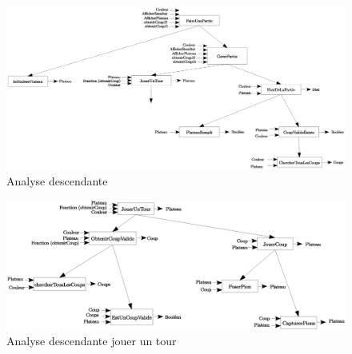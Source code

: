 \begin{figure}[h]
  \includegraphics[width=18cm]{./sourcesIMAGES/analyse_descendante.eps}
  \caption{Analyse descendante}
\end{figure}
\newpage
\begin{figure}[h]
  \includegraphics[width=18cm]{./sourcesIMAGES/analyse_descendante_jouer_un_tour.eps}
  \caption{Analyse descendante jouer un tour}
\end{figure}

